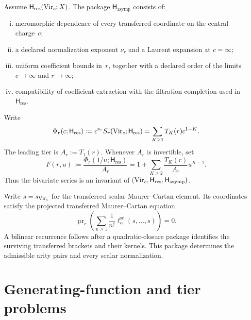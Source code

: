 \begin{definition}
\ClaimStatusDefinitional
\label{def:bivariate-F}
Assume \(\mathsf H_{\mathrm{res}}(\mathrm{Vir}_c;X)\).  The package
\(\mathsf H_{\mathrm{asymp}}\) consists of:
\begin{enumerate}[(i)]
\item meromorphic dependence of every transferred coordinate on the
central charge~\(c\);
\item a declared normalization exponent \(\nu_r\) and a Laurent
expansion at \(c=\infty\);
\item uniform coefficient bounds in~\(r\), together with a declared
order of the limits \(c\to\infty\) and \(r\to\infty\);
\item compatibility of coefficient extraction with the filtration
completion used in \(\mathsf H_{\mathrm{res}}\).
\end{enumerate}
Write
\begin{equation}
 \Phi_r(c;\mathsf H_{\mathrm{res}})
 :=c^{\nu_r}S_r(\mathrm{Vir}_c;\mathsf H_{\mathrm{res}})
 =\sum_{K\ge1}T_K(r)c^{1-K}.
 \label{eq:all-tier-raw-intro}
\end{equation}
The leading tier is \(A_r:=T_1(r)\).  Whenever \(A_r\) is invertible,
set
\begin{equation}
 F(r,u):=\frac{\Phi_r(1/u;\mathsf H_{\mathrm{res}})}{A_r}
 =1+\sum_{K\ge2}\frac{T_K(r)}{A_r}u^{K-1}.
 \label{eq:bivariate-F-intro}
 \label{eq:F-def}
\end{equation}
Thus the bivariate series is an invariant of
\((\mathrm{Vir}_c,\mathsf H_{\mathrm{res}},\mathsf H_{\mathrm{asymp}})\).
\end{definition}

\begin{remark}
Write \(s=s_{\mathrm{Vir}_c}\) for the transferred scalar Maurer--Cartan
element.  Its coordinates satisfy the projected transferred
Maurer--Cartan equation
\begin{equation}
 \operatorname{pr}_r\left(
 \sum_{n\ge1}\frac1{n!}
 \ell_n^{\mathrm{sc}}(s,\ldots,s)\right)=0.
 \label{eq:bilinear-master-intro}
\end{equation}
A bilinear recurrence follows after a quadratic-closure package
identifies the surviving transferred brackets and their kernels.
This package determines the admissible arity pairs and every scalar
normalization.
\end{remark}

\section{Generating-function and tier problems}


